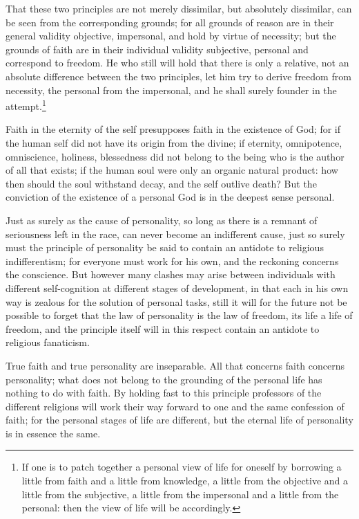 \documentclass[12pt,a4paper,openany]{book}
\newcommand{\opage}[1]{\marginnote{\footnotesize\textit{[#1]}}}
\begin{document}
That these two principles are not merely dissimilar, but
absolutely dissimilar, can be seen from the corresponding grounds;
for all grounds of reason are in their general validity
objective, impersonal, and hold by virtue of necessity;
but the grounds of faith are in their individual validity
subjective, personal and correspond to freedom. He
who still will hold that there is only a relative, not an
absolute difference between the two principles, let him try
to derive freedom from necessity, the personal from the
impersonal, and he shall surely founder in the attempt.\footnote[1]{If one is to patch together a personal view of life for oneself by borrowing a little from faith and a little from knowledge, a little from the objective and a little from the subjective, a little from the impersonal and a little from the personal: then the view of life will be accordingly.}

Faith in the eternity of the self presupposes faith in
the existence of God; for if the human self did not
have its origin from the divine; if
eternity, omnipotence, omniscience, holiness, blessedness did not
\setcounter{footnote}{0}%
\opage{621}belong to the being who is the author of all that exists; if
the human soul were only an organic natural product:
how then should the soul withstand decay,
and the self outlive death? But the conviction
of the existence of a personal God is in the deepest
sense personal.

Just as surely as the cause of personality, so long as there is
a remnant of seriousness left in the race, can never become an indifferent
cause, just so surely must the principle of personality be said
to contain an antidote to religious indifferentism; for
everyone must work for his own, and the reckoning concerns
the conscience. But however many clashes may
arise between individuals with different self-cognition
at different stages of development, in that each
in his own way is zealous for the solution of personal tasks, still
it will for the future not be possible to forget that the law of
personality is the law of freedom, its life a life of
freedom, and the principle itself will in this respect
contain an antidote to religious fanaticism.

True faith and true personality are inseparable.
All that concerns faith concerns personality;
what does not belong to the grounding of the personal
life has nothing to do with faith. By holding
fast to this principle professors of the
different religions will work their way forward to one and the same
confession of faith; for the personal stages of life are different,
but the eternal life of personality is in essence the
same.
\end{document}
